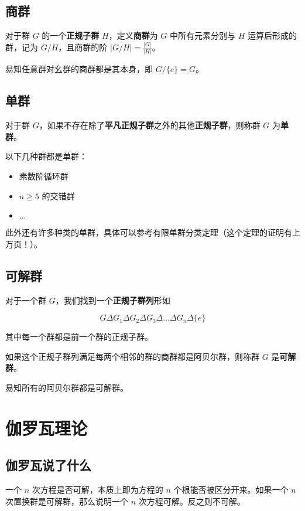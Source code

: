 \documentclass[hyperref,UTF8,12pt,a4paper]{ctexart}
\begin{document}
\subsection{商群}

对于群 $G$ 的一个\textbf{正规子群} $H$，定义\textbf{商群}为 $G$ 中所有元素分别与 $H$ 运算后形成的群，记为 $G/H$，且商群的阶 $|G/H|=\frac{|G|}{|H|}$。

易知任意群对幺群的商群都是其本身，即 $G/\{e\}=G$。

\subsection{单群}

对于群 $G$，如果不存在除了\textbf{平凡正规子群}之外的其他\textbf{正规子群}，则称群 $G$ 为\textbf{单群}。

以下几种群都是单群：

\begin{itemize}
\item 素数阶循环群
\item $n \ge 5$ 的交错群
\item $...$
\end{itemize}

此外还有许多种类的单群，具体可以参考有限单群分类定理（这个定理的证明有上万页！）。

\subsection{可解群}

对于一个群 $G$，我们找到一个\textbf{正规子群列}形如

$$
G \Delta G_1 \Delta G_2 \Delta G_3 \Delta ... \Delta G_n \Delta \{e\}
$$

其中每一个群都是前一个群的正规子群。

如果这个正规子群列满足每两个相邻的群的商群都是阿贝尔群，则称群 $G$ 是\textbf{可解群}。

易知所有的阿贝尔群都是可解群。

\section{伽罗瓦理论}

\subsection{伽罗瓦说了什么}

一个 $n$ 次方程是否可解，本质上即为方程的 $n$ 个根能否被区分开来。如果一个 $n$ 次置换群是可解群，那么说明一个 $n$ 次方程可解。反之则不可解。
\end{document}
